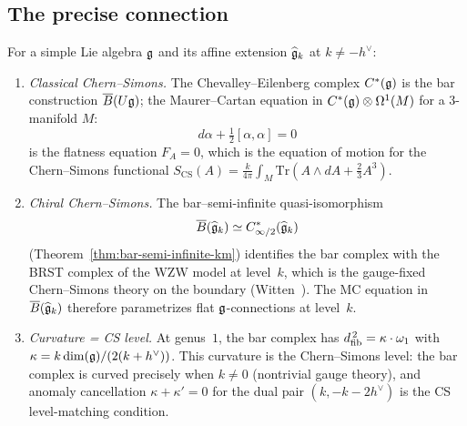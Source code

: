 \subsection{The precise connection}

\begin{theorem}\label{thm:cs-koszul-km}
For a simple Lie algebra $\mathfrak{g}$ and its affine extension
$\widehat{\mathfrak{g}}_k$ at $k \neq -h^\vee$:
\begin{enumerate}[label=\textup{(\roman*)}]
\item \emph{Classical Chern--Simons.}
  The Chevalley--Eilenberg complex $C^*(\mathfrak{g})$ is the bar
  construction $\overline{B}(U\mathfrak{g})$\textup{;}
  the Maurer--Cartan equation in $C^*(\mathfrak{g}) \otimes \Omega^1(M)$
  for a $3$-manifold $M$:
  \[
  d\alpha + \tfrac{1}{2}[\alpha, \alpha] = 0
  \]
  is the flatness equation $F_A = 0$, which is the equation of
  motion for the Chern--Simons functional
  $S_{\mathrm{CS}}(A) = \frac{k}{4\pi}\int_M
  \mathrm{Tr}(A \wedge dA + \frac{2}{3}A^3)$.
\item \emph{Chiral Chern--Simons.}
  The bar--semi-infinite quasi-isomorphism
  \[
  \overline{B}(\widehat{\mathfrak{g}}_k) \simeq
  C^*_{\infty/2}(\widehat{\mathfrak{g}}_k)
  \]
  (Theorem~\ref{thm:bar-semi-infinite-km})
  identifies the bar complex with the BRST complex of
  the WZW model at level~$k$, which is the gauge-fixed
  Chern--Simons theory on the boundary
  \textup{(}Witten~\cite{Wit89}\textup{)}.
  The MC equation in $\overline{B}(\widehat{\mathfrak{g}}_k)$
  therefore parametrizes flat $\mathfrak{g}$-connections at
  level~$k$.
\item \emph{Curvature = CS level.}
  At genus~$1$, the bar complex has $d_{\mathrm{fib}}^{\,2} = \kappa \cdot \omega_1$
  with $\kappa = k\dim(\mathfrak{g})/(2(k+h^\vee))$.  This curvature is
  the Chern--Simons level: the bar complex is curved precisely
  when $k \neq 0$ \textup{(}nontrivial gauge theory\textup{)},
  and anomaly cancellation $\kappa + \kappa' = 0$ for the dual
  pair $(k, -k-2h^\vee)$ is the CS level-matching condition.
\end{enumerate}
\end{theorem}

